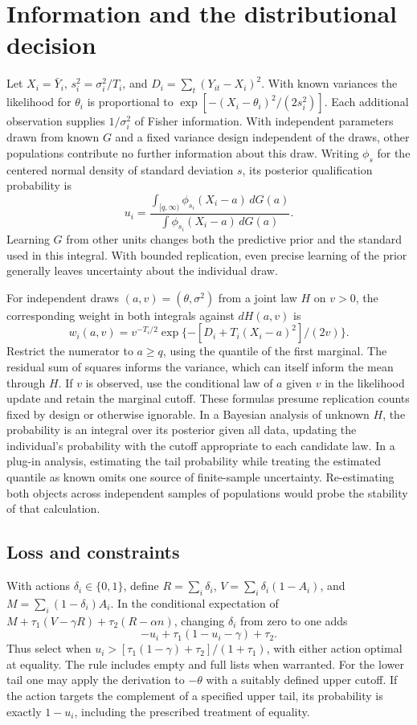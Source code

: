\documentclass[11pt]{article}
\begin{document}
\section{Information and the distributional decision}
Let $X_i=\bar Y_i$, $s_i^2=\sigma_i^2/T_i$, and $D_i=\sum_t(Y_{it}-X_i)^2$. With known variances the likelihood for $\theta_i$ is proportional to $\exp[-(X_i-\theta_i)^2/(2s_i^2)]$. Each additional observation supplies $1/\sigma_i^2$ of Fisher information. With independent parameters drawn from known $G$ and a fixed variance design independent of the draws, other populations contribute no further information about this draw. Writing $\phi_s$ for the centered normal density of standard deviation $s$, its posterior qualification probability is
\[
 u_i=\frac{\int_{[q,\infty)}\phi_{s_i}(X_i-a)\,dG(a)}
 {\int\phi_{s_i}(X_i-a)\,dG(a)}.
\]
Learning $G$ from other units changes both the predictive prior and the standard used in this integral. With bounded replication, even precise learning of the prior generally leaves uncertainty about the individual draw.

For independent draws $(a,v)=(\theta,\sigma^2)$ from a joint law $H$ on $v>0$, the corresponding weight in both integrals against $dH(a,v)$ is
\[
 w_i(a,v)=v^{-T_i/2}\exp\{-[D_i+T_i(X_i-a)^2]/(2v)\}.
\]
Restrict the numerator to $a\ge q$, using the quantile of the first marginal. The residual sum of squares informs the variance, which can itself inform the mean through $H$. If $v$ is observed, use the conditional law of $a$ given $v$ in the likelihood update and retain the marginal cutoff. These formulas presume replication counts fixed by design or otherwise ignorable. In a Bayesian analysis of unknown $H$, the probability is an integral over its posterior given all data, updating the individual's probability with the cutoff appropriate to each candidate law. In a plug-in analysis, estimating the tail probability while treating the estimated quantile as known omits one source of finite-sample uncertainty. Re-estimating both objects across independent samples of populations would probe the stability of that calculation.

\subsection{Loss and constraints}
With actions $\delta_i\in\{0,1\}$, define $R=\sum_i\delta_i$, $V=\sum_i\delta_i(1-A_i)$, and $M=\sum_i(1-\delta_i)A_i$. In the conditional expectation of
$M+\tau_1(V-\gamma R)+\tau_2(R-\alpha n)$, changing $\delta_i$ from zero to one adds
\[
 -u_i+\tau_1(1-u_i-\gamma)+\tau_2 .
\]
Thus select when $u_i>[\tau_1(1-\gamma)+\tau_2]/(1+\tau_1)$, with either action optimal at equality. The rule includes empty and full lists when warranted. For the lower tail one may apply the derivation to $-\theta$ with a suitably defined upper cutoff. If the action targets the complement of a specified upper tail, its probability is exactly $1-u_i$, including the prescribed treatment of equality.
\end{document}
